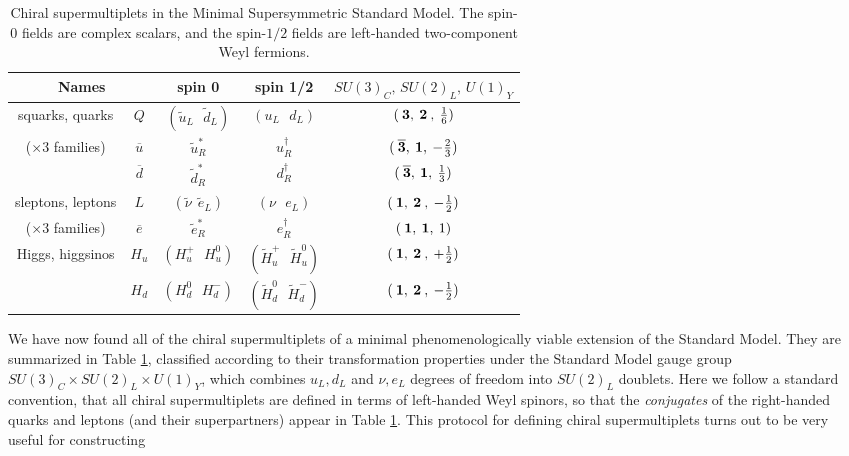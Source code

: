 \documentclass[12pt]{article}
\def\sbar{\overline}
\def\stilde{\widetilde}
\begin{document}
\renewcommand{\arraystretch}{1.4}
\begin{table}[tb]
\begin{center}
\begin{tabular}{|c|c|c|c|c|}
\hline
\multicolumn{2}{|c|}{Names} 
& spin 0 & spin 1/2 & $SU(3)_C ,\, SU(2)_L ,\, U(1)_Y$
\\  \hline\hline
squarks, quarks & $Q$ & $({\stilde u}_L\>\>\>{\stilde d}_L )$&
 $(u_L\>\>\>d_L)$ & $(\>{\bf 3},\>{\bf 2}\>,\>{1\over 6})$
\\
($\times 3$ families) & $\sbar u$
&${\stilde u}^*_R$ & $u^\dagger_R$ & 
$(\>{\bf \overline 3},\> {\bf 1},\> -{2\over 3})$
\\ & $\sbar d$ &${\stilde d}^*_R$ & $d^\dagger_R$ & 
$(\>{\bf \overline 3},\> {\bf 1},\> {1\over 3})$
\\  \hline
sleptons, leptons & $L$ &$({\stilde \nu}\>\>{\stilde e}_L )$&
 $(\nu\>\>\>e_L)$ & $(\>{\bf 1},\>{\bf 2}\>,\>-{1\over 2})$
\\
($\times 3$ families) & $\sbar e$
&${\stilde e}^*_R$ & $e^\dagger_R$ & $(\>{\bf 1},\> {\bf 1},\>1)$
\\  \hline
Higgs, higgsinos &$H_u$ &$(H_u^+\>\>\>H_u^0 )$&
$(\stilde H_u^+ \>\>\> \stilde H_u^0)$& 
$(\>{\bf 1},\>{\bf 2}\>,\>+{1\over 2})$
\\ &$H_d$ & $(H_d^0 \>\>\> H_d^-)$ & $(\stilde H_d^0 \>\>\> \stilde H_d^-)$& 
$(\>{\bf 1},\>{\bf 2}\>,\>-{1\over 2})$
\\  \hline
\end{tabular}
\caption{Chiral supermultiplets in the Minimal Supersymmetric Standard Model.
The spin-$0$ fields are complex scalars, and the spin-$1/2$ fields are 
left-handed two-component Weyl fermions.\label{tab:chiral}}
\vspace{-0.6cm}
\end{center}
\end{table}
We have now found all of the chiral supermultiplets of a minimal
phenomenologically viable extension of the Standard Model. They are
summarized in Table \ref{tab:chiral}, 
classified according to their transformation
properties under the Standard Model gauge group $SU(3)_C\times SU(2)_L
\times U(1)_Y$, which combines $u_L,d_L$ and $\nu,e_L$ degrees of freedom
into $SU(2)_L$ doublets. Here we follow a standard convention, that all
chiral supermultiplets are defined in terms of left-handed Weyl spinors,
so that the {\it conjugates} of the right-handed quarks and leptons (and
their superpartners) appear in Table \ref{tab:chiral}. 
This protocol for defining chiral
supermultiplets turns out to be very useful for constructing
\end{document}
